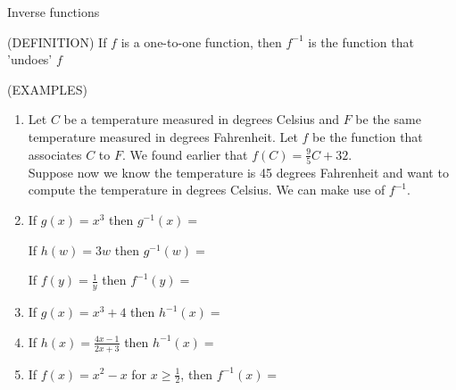 \documentclass[11pt]{article}
\begin{document}
\pagebreak

  \begin{center}
\Large
\rm{Inverse functions}
  \end{center}
  (DEFINITION) 
  If $f$ is  a one-to-one function, then $f^{-1}$ is the function that 'undoes' $f$
  \vspace{2in}

  (EXAMPLES)

  \begin{enumerate}
  \item{
Let $C$ be a temperature measured in degrees Celsius and $F$ be the same temperature measured in degrees Fahrenheit.
Let $f$ be the function that associates $C$ to $F$.  We found earlier that $f(C) = \frac95 C + 32$.\\
Suppose now we know the temperature is 45 degrees Fahrenheit and want to compute the temperature in degrees Celsius.
We can make use of $f^{-1}$.
}
\vspace{3in}
\item{ If $g(x) = x^3$ then $g^{-1}(x) = $ \\
  
  \vspace{0.2in}
  
  If $h(w) = 3w$ then $g^{-1}(w) = $ \\
  
  \vspace{0.2in}

  If $f(y) = \frac{1}{y}$ then $f^{-1}(y) = $ \\

  \vspace{0.2in}
  
}

\item{If $g(x) = x^3+4$ then $h^{-1}(x) = $}
  
  \vspace{2in}
  
\item{If $h(x) = \frac{4x-1}{2x+3}$ then $h^{-1}(x) = $}

    \vspace{2in}
  
\item{If $f(x) = x^2-x$ for $x \ge \frac12 $, then $f^{-1}(x) = $

}
\end{enumerate}



  
\end{document}
